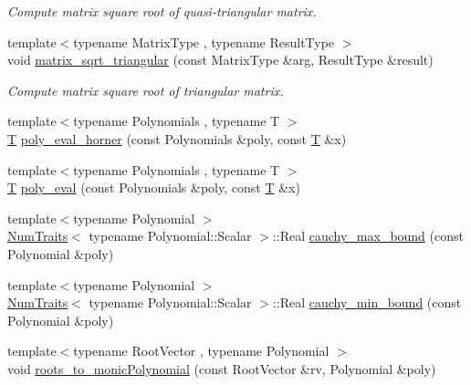 \begin{DoxyCompactItemize}
\begin{DoxyCompactList}\small\item\em Compute matrix square root of quasi-\/triangular matrix. \end{DoxyCompactList}\item 
{\footnotesize template$<$typename Matrix\+Type , typename Result\+Type $>$ }\\void \hyperlink{namespace_eigen_ae51c91f920f6ea4a7f6f72caa1e8249f}{matrix\+\_\+sqrt\+\_\+triangular} (const Matrix\+Type \&arg, Result\+Type \&result)
\begin{DoxyCompactList}\small\item\em Compute matrix square root of triangular matrix. \end{DoxyCompactList}\item 
{\footnotesize template$<$typename Polynomials , typename T $>$ }\\\hyperlink{group___sparse_core___module}{T} \hyperlink{namespace_eigen_aadbf059bc28ce1cf94c57c1454633d40}{poly\+\_\+eval\+\_\+horner} (const Polynomials \&poly, const \hyperlink{group___sparse_core___module}{T} \&x)
\item 
{\footnotesize template$<$typename Polynomials , typename T $>$ }\\\hyperlink{group___sparse_core___module}{T} \hyperlink{namespace_eigen_adb64ffddaa9e83634e3ab0e3fd3664f5}{poly\+\_\+eval} (const Polynomials \&poly, const \hyperlink{group___sparse_core___module}{T} \&x)
\item 
{\footnotesize template$<$typename Polynomial $>$ }\\\hyperlink{group___core___module_struct_eigen_1_1_num_traits}{Num\+Traits}$<$ typename Polynomial\+::\+Scalar $>$\+::Real \hyperlink{namespace_eigen_ac90ec4513aa09bb8ad54daa209322d03}{cauchy\+\_\+max\+\_\+bound} (const Polynomial \&poly)
\item 
{\footnotesize template$<$typename Polynomial $>$ }\\\hyperlink{group___core___module_struct_eigen_1_1_num_traits}{Num\+Traits}$<$ typename Polynomial\+::\+Scalar $>$\+::Real \hyperlink{namespace_eigen_a43f0af310d5cc131eb5e806f241af951}{cauchy\+\_\+min\+\_\+bound} (const Polynomial \&poly)
\item 
{\footnotesize template$<$typename Root\+Vector , typename Polynomial $>$ }\\void \hyperlink{namespace_eigen_afbc3648f7ef67db3d5d04454fc1257fd}{roots\+\_\+to\+\_\+monic\+Polynomial} (const Root\+Vector \&rv, Polynomial \&poly)
\item 

\end{DoxyCompactItemize}
